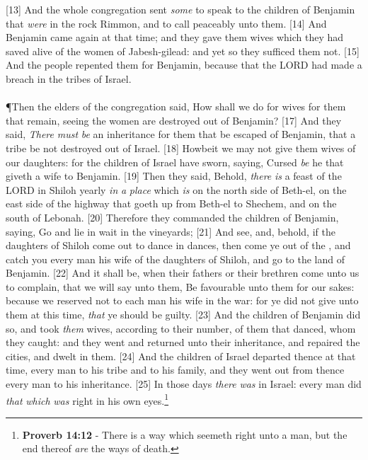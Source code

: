 [13] \textcolor[cmyk]{0.99998,1,0,0}{And the whole congregation sent \emph{some} to speak to the children of Benjamin that \emph{were} in the rock Rimmon, and to call peaceably unto them.}
[14] \textcolor[cmyk]{0.99998,1,0,0}{And Benjamin came again at that time; and they gave them wives which they had saved alive of the women of Jabesh-gilead: and yet so they sufficed them not.}
[15] \textcolor[cmyk]{0.99998,1,0,0}{And the people repented them for Benjamin, because that the LORD had made a breach in the tribes of Israel.}\\
\\
\P \textcolor[cmyk]{0.99998,1,0,0}{Then the elders of the congregation said, How shall we do for wives for them that remain, seeing the women are destroyed out of Benjamin?}
[17] \textcolor[cmyk]{0.99998,1,0,0}{And they said, \emph{There} \emph{must} \emph{be} an inheritance for them that be escaped of Benjamin, that a tribe be not destroyed out of Israel.}
[18] \textcolor[cmyk]{0.99998,1,0,0}{Howbeit we may not give them wives of our daughters: for the children of Israel have sworn, saying, Cursed \emph{be} he that giveth a wife to Benjamin.}
[19] \textcolor[cmyk]{0.99998,1,0,0}{Then they said, Behold, \emph{there} \emph{is} a feast of the LORD in Shiloh yearly \emph{in} \emph{a} \emph{place} which \emph{is} on the north side of Beth-el, on the east side of the highway that goeth up from Beth-el to Shechem, and on the south of Lebonah.}
[20] \textcolor[cmyk]{0.99998,1,0,0}{Therefore they commanded the children of Benjamin, saying, Go and lie in wait in the vineyards;}
[21] \textcolor[cmyk]{0.99998,1,0,0}{And see, and, behold, if the daughters of Shiloh come out to dance in dances, then come ye out of the , and catch you every man his wife of the daughters of Shiloh, and go to the land of Benjamin.}
[22] \textcolor[cmyk]{0.99998,1,0,0}{And it shall be, when their fathers or their brethren come unto us to complain, that we will say unto them, Be favourable unto them for our sakes: because we reserved not to each man his wife in the war: for ye did not give unto them at this time, \emph{that} ye should be guilty.}
[23] \textcolor[cmyk]{0.99998,1,0,0}{And the children of Benjamin did so, and took \emph{them} wives, according to their number, of them that danced, whom they caught: and they went and returned unto their inheritance, and repaired the cities, and dwelt in them.}
[24] \textcolor[cmyk]{0.99998,1,0,0}{And the children of Israel departed thence at that time, every man to his tribe and to his family, and they went out from thence every man to his inheritance.}
[25] \textcolor[cmyk]{0.99998,1,0,0}{In those days \emph{there} \emph{was}  in Israel: every man did \emph{that} \emph{which} \emph{was} right in his own eyes.}\footnote{\textbf{Proverb 14:12} - There is a way which seemeth right unto a man, but the end thereof \emph{are} the ways of death.}
